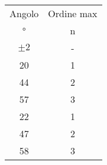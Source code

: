 \begin{table}[H]
\begin{center}
\begin{tabular}{|c|c|}
\hline
    Angolo	&	Ordine max	\\
    °	&	n	\\
    $\pm 2$	&	-	\\ \hline
    20	&	1	\\
    44	&	2	\\
    57	&	3	\\
    22	&	1	\\
    47	&	2	\\
    58	&	3	\\ \hline
\end{tabular}
\end{center}
\end{table}